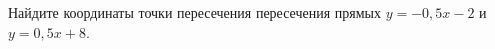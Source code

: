 \begin{ex}
	\begin{condition}
		Найдите координаты точки пересечения пересечения прямых \( y=-0,5x-2 \) и \( y=0,5x+8 \).
	\end{condition}
\end{ex}
